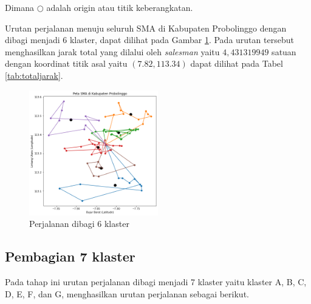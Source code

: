 \noindent Dimana $\bigcirc$ adalah origin atau titik keberangkatan.

Urutan perjalanan menuju seluruh SMA di Kabupaten Probolinggo dengan dibagi menjadi 6 klaster, dapat dilihat pada Gambar \ref{fig:hasil_mtsp6}. Pada urutan tersebut menghasilkan jarak total yang dilalui oleh \textit{salesman} yaitu $4,431319949$ satuan dengan koordinat titik asal yaitu $(7.82, 113.34)$ dapat dilihat pada Tabel \ref{tab:totaljarak}.

\begin{figure}[H]
\centering
\includegraphics[width=0.5\textwidth]{Gambar/hasil_mtsp/6}
\caption{Perjalanan dibagi 6 klaster}
\label{fig:hasil_mtsp6}
\end{figure}

\subsection{Pembagian 7 klaster}

Pada tahap ini urutan perjalanan dibagi menjadi 7 klaster yaitu klaster A, B, C, D, E, F, dan G, menghasilkan urutan perjalanan sebagai berikut.

